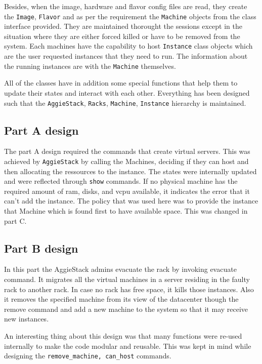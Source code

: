 \documentclass[letterpaper]{article}
\begin{document}
Besides, when the image, hardware and flavor config files are read, they create the \texttt{Image}, \texttt{Flavor} and as per the requirement the \texttt{Machine} objects from the class interface provided. They are maintained thorought the sessions except in the situation where they are either forced killed or have to be removed from the system. Each machines have the capability to host \texttt{Instance} class objects which are the user requested instances that they need to run. The information about the running instances are with the \texttt{Machine} themselves. 

All of the classes have in addition some special functions that help them to update their states and interact with each other. Everything has been designed such that the \texttt{AggieStack}, \texttt{Racks}, \texttt{Machine}, \texttt{Instance} hierarchy is maintained. 

\subsection{Part A design}

The part A design required the commands that create virtual servers. This was achieved by \texttt{AggieStack} by calling the Machines, deciding if they can host and then allocating the ressources to the instance. The states were internally updated and were reflected through \texttt{show} commands. If no physical machine has the required amount of ram, disks, and vcpu available, it indicates the error that it can't add the instance. The policy that was used here was to provide the instance that Machine which is found first to have available space. This was changed in part C.

\subsection{Part B design}

In this part the AggieStack admins evacuate the rack by invoking evacuate command. It migrates all the virtual machines in a server residing in the faulty rack to another rack. In case no rack has free space, it kills those instances. Also it removes the specified machine from its view of the datacenter though the remove command and add a new machine to the system so that it may receive new instances.

An interesting thing about this design was that many functions were re-used internally to make the code modular and reusable. This was kept in mind while designing the \texttt{remove\_machine, can\_host} commands.
\end{document}
